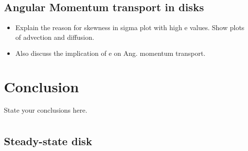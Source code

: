 \documentclass[useAMS,usenatbib]{mn2e}
\begin{document}
\subsection{Angular Momentum transport in disks}
\begin{itemize}
\item Explain the reason for skewness in sigma plot with high e
  values. Show plots of advection and diffusion. 
\item Also discuss the implication of e on Ang. momentum transport. 
\end{itemize}
\section{Conclusion}
State your conclusions here. 
\appendix
\section{}
\subsection{Steady-state disk}
\label{a1}
\end{document}
